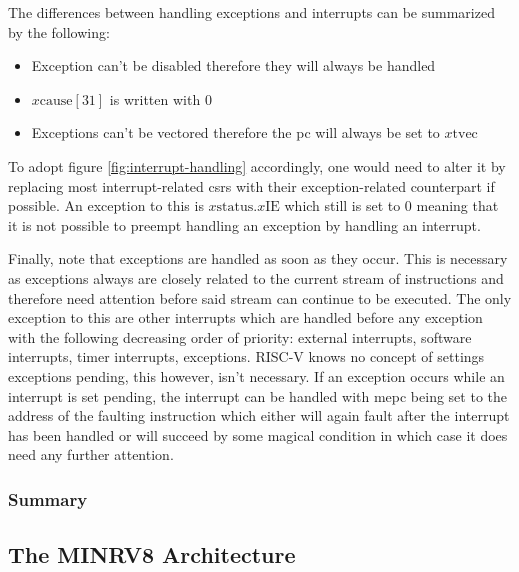 The differences between handling exceptions and interrupts can be summarized by the following:
\begin{itemize}
    \item Exception can't be disabled therefore they will always be handled
    \item $ x\text{cause}[31] $ is written with $ 0 $
    \item Exceptions can't be vectored therefore the \gls{pc} will always be set to $ x\text{tvec} $
\end{itemize}

To adopt figure \ref{fig:interrupt-handling} accordingly, one would need to alter it by replacing most interrupt-related \glspl{csr} with their exception-related counterpart if possible.
An exception to this is $ x\text{status}.x\text{IE} $ which still is set to 0 meaning that it is not possible to preempt handling an exception by handling an interrupt.

Finally, note that exceptions are handled as soon as they occur.
This is necessary as exceptions always are closely related to the current stream of instructions and therefore need attention before said stream can continue to be executed.
The only exception to this are other interrupts which are handled before any exception with the following decreasing order of priority: external interrupts, software interrupts, timer interrupts, exceptions.
RISC-V knows no concept of settings exceptions pending, this however, isn't necessary.
If an exception occurs while an interrupt is set pending, the interrupt can be handled with \gls{mepc} being set to the address of the faulting instruction which either will again fault after the interrupt has been handled or will succeed by some magical condition in which case it does need any further attention.


\subsubsection{Summary}




\subsection{The MINRV8 Architecture}
\label{sec:minrv8}

